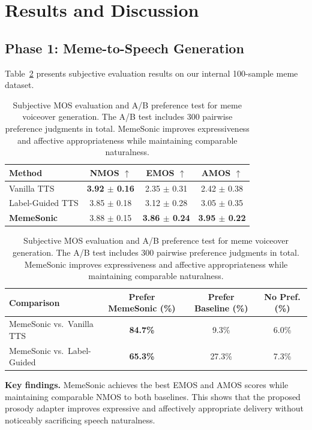 \section{Results and Discussion}

\subsection{Phase 1: Meme-to-Speech Generation}

Table~\ref{tab:audio_results} presents subjective evaluation results on our internal 100-sample
meme dataset.

\begin{table}[h]
\centering
\caption{Subjective MOS evaluation and A/B preference test for meme voiceover generation. The A/B test includes 300 pairwise preference judgments in total. MemeSonic improves expressiveness and affective appropriateness while maintaining comparable naturalness.}
\label{tab:audio_results}
\begin{tabular}{lccc}
\toprule
\textbf{Method} & \textbf{NMOS} $\uparrow$ & \textbf{EMOS} $\uparrow$ & \textbf{AMOS} $\uparrow$ \\
\midrule
Vanilla TTS        & \textbf{3.92 $\pm$ 0.16} & 2.35 $\pm$ 0.31 & 2.42 $\pm$ 0.38 \\
Label-Guided TTS   & 3.85 $\pm$ 0.18          & 3.12 $\pm$ 0.28 & 3.05 $\pm$ 0.35 \\
\textbf{MemeSonic} & 3.88 $\pm$ 0.15          & \textbf{3.86 $\pm$ 0.24} & \textbf{3.95 $\pm$ 0.22} \\
\bottomrule
\end{tabular}

\vspace{0.8em}
\begin{tabular}{lccc}
\toprule
\textbf{Comparison} & \textbf{Prefer MemeSonic (\%)} & \textbf{Prefer Baseline (\%)} & \textbf{No Pref. (\%)} \\
\midrule
MemeSonic vs.\ Vanilla TTS    & \textbf{84.7\%} & 9.3\%  & 6.0\% \\
MemeSonic vs.\ Label-Guided   & \textbf{65.3\%} & 27.3\% & 7.3\% \\
\bottomrule
\end{tabular}
\end{table}
\textbf{Key findings.}
MemeSonic achieves the best EMOS and AMOS scores while maintaining comparable NMOS to both baselines. This shows that the proposed prosody adapter improves expressive and affectively appropriate delivery without noticeably sacrificing speech naturalness.

